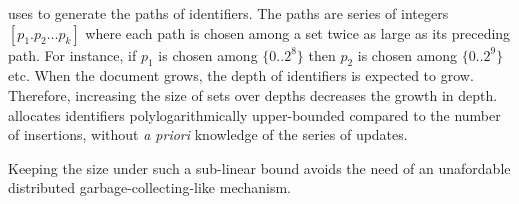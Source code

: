 \CRATE uses \LSEQ to generate the paths of identifiers. The paths are series of
integers $[p_1.p_2\ldots p_k]$ where each path is chosen among a set twice as
large as its preceding path. For instance, if $p_1$ is chosen among $\{0..2^8\}$
then $p_2$ is chosen among $\{0..2^9\}$ etc.  When the document grows, the depth
of identifiers is expected to grow. Therefore, increasing the size of sets over
depths decreases the growth in depth.  \LSEQ allocates identifiers
polylogarithmically upper-bounded compared to the number of insertions, without
\emph{a priori} knowledge of the series of updates.

Keeping the size under such a sub-linear bound avoids the need of an unafordable
distributed garbage-collecting-like mechanism.

